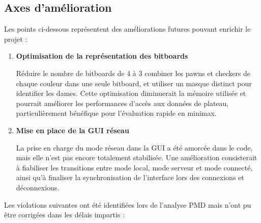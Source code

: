 \documentclass[a4paper]{article}
\begin{document}
\subsection{Axes d'amélioration}
Les points ci-dessous représentent des améliorations futures pouvant enrichir le projet :

\begin{enumerate}
    \item \textbf{Optimisation de la représentation des bitboards}
    
    Réduire le nombre de bitboards de 4 à 3 combiner les pawns et checkers de chaque couleur dans une seule bitboard, 
    et utiliser un masque distinct pour identifier les dames. Cette optimisation diminuerait la mémoire utilisée et 
    pourrait améliorer les performances d'accès aux données de plateau, particulièrement bénéfique pour 
    l'évaluation rapide en minimax.

  \item \textbf{Mise en place de la GUI réseau}

  La prise en charge du mode réseau dans la GUI a été amorcée dans le code, mais elle n'est pas encore totalement stabilisée. Une amélioration consisterait à fiabiliser les transitions entre mode local, mode serveur et mode connecté, ainsi qu'à finaliser la synchronisation de l'interface lors des connexions et déconnexions.

\end{enumerate}

Les violations suivantes ont été identifiées lors de l'analyse PMD mais n'ont pu être corrigées dans les délais impartis :
\end{document}
